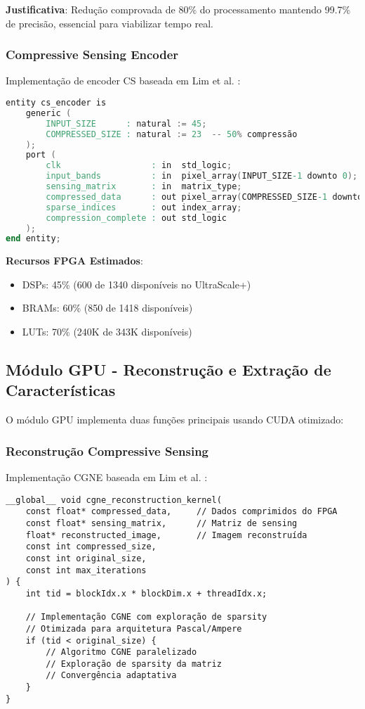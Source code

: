 \textbf{Justificativa}: Redução comprovada de 80\% do processamento mantendo 99.7\% de precisão, essencial para viabilizar tempo real.

\subsubsection{Compressive Sensing Encoder}

Implementação de encoder CS baseada em Lim et al. \cite{lim2022}:

\begin{lstlisting}[language=verilog, caption=CS Encoder em VHDL]
entity cs_encoder is
    generic (
        INPUT_SIZE      : natural := 45;
        COMPRESSED_SIZE : natural := 23  -- 50% compressão
    );
    port (
        clk                  : in  std_logic;
        input_bands          : in  pixel_array(INPUT_SIZE-1 downto 0);
        sensing_matrix       : in  matrix_type;
        compressed_data      : out pixel_array(COMPRESSED_SIZE-1 downto 0);
        sparse_indices       : out index_array;
        compression_complete : out std_logic
    );
end entity;
\end{lstlisting}

\textbf{Recursos FPGA Estimados}:
\begin{itemize}
\item DSPs: 45\% (600 de 1340 disponíveis no UltraScale+)
\item BRAMs: 60\% (850 de 1418 disponíveis)
\item LUTs: 70\% (240K de 343K disponíveis)
\end{itemize}

\subsection{Módulo GPU - Reconstrução e Extração de Características}

O módulo GPU implementa duas funções principais usando CUDA otimizado:

\subsubsection{Reconstrução Compressive Sensing}

Implementação CGNE baseada em Lim et al. \cite{lim2022}:

\begin{lstlisting}[language=cuda, caption=CGNE Solver em CUDA]
__global__ void cgne_reconstruction_kernel(
    const float* compressed_data,     // Dados comprimidos do FPGA
    const float* sensing_matrix,      // Matriz de sensing
    float* reconstructed_image,       // Imagem reconstruída
    const int compressed_size,
    const int original_size,
    const int max_iterations
) {
    int tid = blockIdx.x * blockDim.x + threadIdx.x;
    
    // Implementação CGNE com exploração de sparsity
    // Otimizada para arquitetura Pascal/Ampere
    if (tid < original_size) {
        // Algoritmo CGNE paralelizado
        // Exploração de sparsity da matriz
        // Convergência adaptativa
    }
}
\end{lstlisting}

